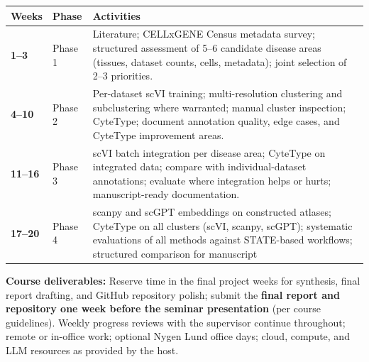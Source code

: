 \documentclass[12pt,a4paper]{article}
\begin{document}
\begin{table}[h!]
\centering
\begin{tabular}{>{\bfseries}p{1.5cm} p{1.8cm} p{10cm}}
\toprule
Weeks & Phase & Activities \\
\midrule
1–3  & Phase 1 & Literature; CELLxGENE Census metadata survey; structured assessment of 5–6 candidate disease areas (tissues, dataset counts, cells, metadata); joint selection of 2–3 priorities. \\[6pt]
4–10 & Phase 2 & Per-dataset scVI training; multi-resolution clustering and subclustering where warranted; manual cluster inspection; CyteType; document annotation quality, edge cases, and CyteType improvement areas. \\[6pt]
11–16 & Phase 3 & scVI batch integration per disease area; CyteType on integrated data; compare with individual-dataset annotations; evaluate where integration helps or hurts; manuscript-ready documentation. \\[6pt]
17–20 & Phase 4 & scanpy and scGPT embeddings on constructed atlases; CyteType on all clusters (scVI, scanpy, scGPT); systematic evaluations of all methods against STATE-based workflows; structured comparison for manuscript
\bottomrule
\end{tabular}
\end{table}

\textbf{Course deliverables:} Reserve time in the final project weeks for synthesis, final report drafting, and GitHub repository polish; submit the \textbf{final report and repository one week before the seminar presentation} (per course guidelines). Weekly progress reviews with the supervisor continue throughout; remote or in-office work; optional Nygen Lund office days; cloud, compute, and LLM resources as provided by the host.

\printbibliography
\end{document}
